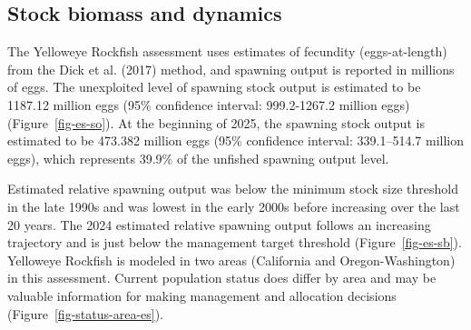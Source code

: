 \documentclass[
]{scrartcl}
\begin{document}
\subsection*{Stock biomass and
dynamics}\label{stock-biomass-and-dynamics}

The Yelloweye Rockfish assessment uses estimates of fecundity
(eggs-at-length) from the Dick et al. (2017) method, and spawning output
is reported in millions of eggs. The unexploited level of spawning stock
output is estimated to be 1187.12 million eggs (95\% confidence
interval: 999.2-1267.2 million eggs) (Figure~\ref{fig-es-so}). At the
beginning of 2025, the spawning stock output is estimated to be 473.382
million eggs (95\% confidence interval: 339.1--514.7 million eggs),
which represents 39.9\% of the unfished spawning output level.

Estimated relative spawning output was below the minimum stock size
threshold in the late 1990s and was lowest in the early 2000s before
increasing over the last 20 years. The 2024 estimated relative spawning
output follows an increasing trajectory and is just below the management
target threshold (Figure~\ref{fig-es-sb}). Yelloweye Rockfish is modeled
in two areas (California and Oregon-Washington) in this assessment.
Current population status does differ by area and may be valuable
information for making management and allocation decisions
(Figure~\ref{fig-status-area-es}).

\begingroup
\fontsize{9.0pt}{10.8pt}\selectfont
\end{document}
